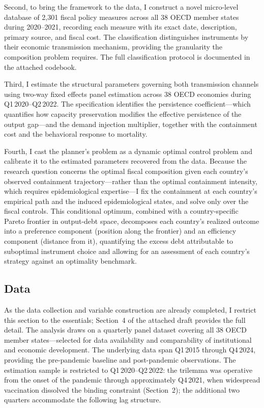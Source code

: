 \documentclass[12pt, a4paper]{article}
\begin{document}
Second, to bring the framework to the data, I construct a novel micro-level database of 2,301 fiscal policy measures across all 38 OECD member states during 2020--2021, recording each measure with its exact date, description, primary source, and fiscal cost. The classification distinguishes instruments by their economic transmission mechanism, providing the granularity the composition problem requires. The full classification protocol is documented in the attached codebook.

\noindent Third, I estimate the structural parameters governing both transmission channels using two-way fixed effects panel estimation across 38 OECD economies during Q1\,2020--Q2\,2022. The specification identifies the persistence coefficient---which quantifies how capacity preservation modifies the effective persistence of the output gap---and the demand injection multiplier, together with the containment cost and the behavioral response to mortality. 

Fourth, I cast the planner's problem as a dynamic optimal control problem and calibrate it to the estimated parameters recovered from the data. Because the research question concerns the optimal fiscal composition given each country's observed containment trajectory---rather than the optimal containment intensity, which requires epidemiological expertise---I fix the containment at each country's empirical path and the induced epidemiological states, and solve only over the fiscal controls. This conditional optimum, combined with a country-specific Pareto frontier in output-debt space, decomposes each country's realized outcome into a preference component (position along the frontier) and an efficiency component (distance from it), quantifying the excess debt attributable to suboptimal instrument choice and allowing for an assessment of each country's strategy against an optimality benchmark.


\subsection{Data}

As the data collection and variable construction are already completed, I restrict this section to the essentials; Section~4 of the attached draft provides the full detail. The analysis draws on a quarterly panel dataset covering all 38 OECD member states---selected for data availability and comparability of institutional and economic development. The underlying data span Q1\,2015 through Q4\,2024, providing the pre-pandemic baseline and post-pandemic observations. The estimation sample is restricted to Q1\,2020--Q2\,2022: the trilemma was operative from the onset of the pandemic through approximately Q4\,2021, when widespread vaccination dissolved the binding constraint (Section~2); the additional two quarters accommodate the following lag structure.
\end{document}
